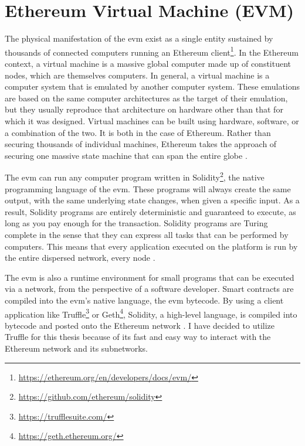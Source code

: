 \section{Ethereum Virtual Machine (EVM)}
\label{sec:evm}
The physical manifestation of the \acrshort{evm} exist as a single entity sustained by thousands of connected computers running an Ethereum client\footnote{\url{https://ethereum.org/en/developers/docs/evm/}}.
In the Ethereum context, a virtual machine is a massive global computer made up of constituent nodes, which are themselves computers. In general, a virtual machine is a computer system that is emulated by another computer system. These emulations are based on the same computer architectures as the target of their emulation, but they usually reproduce that architecture on hardware other than that for which it was designed. Virtual machines can be built using hardware, software, or a combination of the two. It is both in the case of Ethereum. Rather than securing thousands of individual machines, Ethereum takes the approach of securing one massive state machine that can span the entire globe \cite[48]{dannen2017introducing}.

The \acrshort{evm} can run any computer program written in Solidity\footnote{\url{https://github.com/ethereum/solidity}}, the native programming language of the \acrshort{evm}. These programs will always create the same output, with the same underlying state changes, when given a specific input. As a result, Solidity programs are entirely deterministic and guaranteed to execute, as long as you pay enough for the transaction. Solidity programs are Turing complete in the sense that they can express all tasks that can be performed by computers. This means that every application executed on the platform is run by the entire dispersed network, every node \cite[50]{dannen2017introducing}.

The \acrshort{evm} is also a runtime environment for small programs that can be executed via a network, from the perspective of a software developer. Smart contracts are compiled into the \acrshort{evm}'s native language, the \acrshort{evm} bytecode. By using a client application like Truffle\footnote{\url{https://trufflesuite.com/}} or Geth\footnote{\url{https://geth.ethereum.org/}}, Solidity, a high-level language, is compiled into bytecode and posted onto the Ethereum network \cite[51]{dannen2017introducing}. I have decided to utilize Truffle for this thesis because of its fast and easy way to interact with the Ethereum network and its subnetworks.
